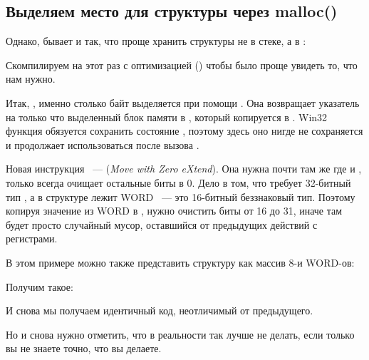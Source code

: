 \subsection{Выделяем место для структуры через malloc()}
\label{struct_malloc_example}

Однако, бывает и так, что проще хранить структуры не в стеке, а в :




Скомпилируем на этот раз с оптимизацией (\Ox) чтобы было проще увидеть то, что нам нужно.




Итак, , именно столько байт выделяется при помощи . 
Она возвращает указатель на только что выделенный блок памяти в \EAX, который копируется в \ESI. 
Win32 функция  обязуется сохранить состояние \ESI, 
поэтому здесь оно нигде не сохраняется и продолжает использоваться после вызова .



Новая инструкция ~--- \MOVZX (\emph{Move with Zero eXtend}). 
Она нужна почти там же где и \MOVSX, 
только всегда очищает остальные биты в 0. Дело в том, что \printf требует 32-битный тип \Tint, 
а в структуре лежит WORD ~--- это 16-битный беззнаковый тип. Поэтому копируя значение из WORD в \Tint, 
нужно очистить биты от 16 до 31, иначе там будет просто случайный мусор, оставшийся от предыдущих действий 
с регистрами.


В этом примере можно также представить структуру как массив 8-и WORD-ов:




Получим такое:



И снова мы получаем идентичный код, неотличимый от предыдущего.

Но и снова нужно отметить, что в реальности так лучше не делать, 
если только вы не знаете точно, что вы делаете.


